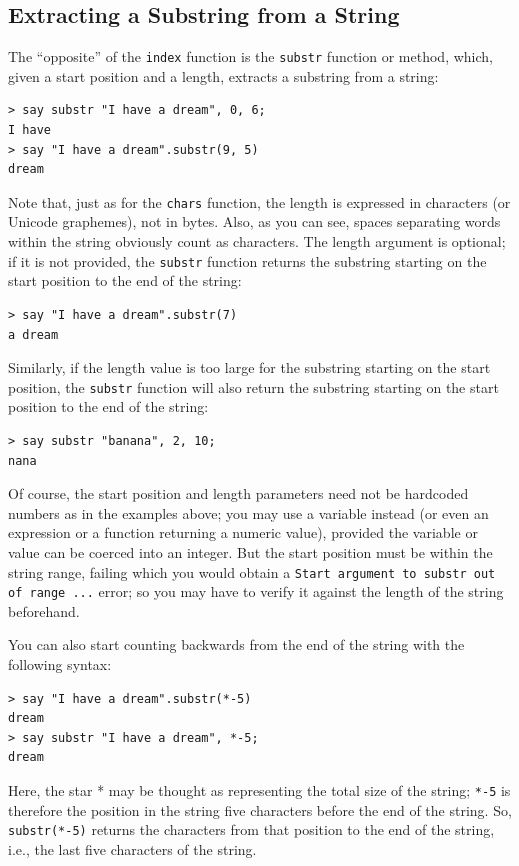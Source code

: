 \subsection{Extracting a Substring from a String}

The ``opposite'' of the {\tt index} function is the {\tt substr} 
function or method, which, given a start position and a length, 
extracts a substring from a string:

\begin{verbatim}
> say substr "I have a dream", 0, 6;
I have
> say "I have a dream".substr(9, 5)
dream
\end{verbatim}
%

Note that, just as for the {\tt chars} function, the length 
is expressed in characters (or Unicode graphemes), not in bytes. 
Also, as you can see, spaces separating words within the string 
obviously count as characters. The length argument is optional; 
if it is not provided, the {\tt substr} function returns the 
substring starting on the start position to the end of the string:

\begin{verbatim}
> say "I have a dream".substr(7)
a dream
\end{verbatim}

Similarly, if the length value is too large for the 
substring starting on the start position, the {\tt substr} 
function will also return the substring starting on the start 
position to the end of the string:

\begin{verbatim}
> say substr "banana", 2, 10;
nana
\end{verbatim}

Of course, the start position and length parameters need not be 
hardcoded numbers as in the examples above; you may use a variable 
instead (or even an expression or a function returning a numeric 
value), provided the variable or value can be coerced into an integer. 
But the start position must be within the string range, 
failing which you would obtain a {\tt Start argument to 
substr out of range ...} error; so you may have to verify it 
against the length of the string beforehand. 

You can also start counting backwards from the end of the 
string with the following syntax:

\begin{verbatim}
> say "I have a dream".substr(*-5)
dream
> say substr "I have a dream", *-5;
dream
\end{verbatim}
%
Here, the star * may be thought as representing the total size 
of the string; \verb'*-5' is therefore the position in the string 
five characters before the end of the string. So, \verb'substr(*-5)' 
returns the characters from that position to the end of the string, 
i.e., the last five characters of the string.

